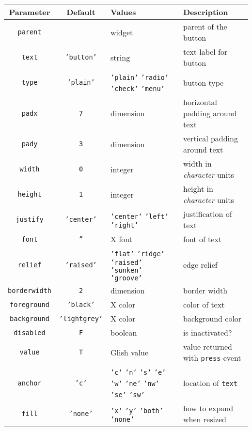 \begin{table}[tbh]
{\small
\begin{center}
\begin{tabular}{|c|c|p{1.6in}|p{1.9in}|}
\hline
Parameter & Default & Values & Description \\
\hline
\hline
{\tt parent}            &               & widget & parent of the button \\ \hline
{\tt text}              & {\tt 'button'}& string & text label for button \\ \hline
{\tt type}              & {\tt 'plain'} & {\tt 'plain'} {\tt 'radio'} {\tt 'check'} {\tt 'menu'} & button type \\ \hline
{\tt padx}              & {\tt 7}       & dimension & horizontal padding around text \\ \hline
{\tt pady}              & {\tt 3}       & dimension & vertical padding around text \\ \hline
{\tt width}             & {\tt 0}       & integer & width in {\em character} units\\ \hline
{\tt height}            & {\tt 1}       & integer & height in {\em character} units\\ \hline
{\tt justify}           & {\tt 'center'}& {\tt 'center'} {\tt 'left'} {\tt 'right'} & justification of text \\ \hline
{\tt font}              & {\tt ''}      & X font & font of text \\ \hline
{\tt relief}            & {\tt 'raised'}& {\tt 'flat'} {\tt 'ridge'} {\tt 'raised'} {\tt 'sunken'} {\tt 'groove'} & edge relief \\ \hline
{\tt borderwidth}       & {\tt 2}       & dimension & border width \\ \hline
{\tt foreground}        & {\tt 'black'} & X color & color of text \\ \hline
{\tt background}        & {\tt 'lightgrey'}& X color & background color \\ \hline
{\tt disabled}          & {\tt F}       & boolean & is inactivated? \\ \hline
{\tt value}             & {\tt T}       & Glish value & value returned with {\tt press} event \\ \hline
{\tt anchor}            & {\tt 'c'}     & {\tt 'c'} {\tt 'n'} {\tt 's'} {\tt 'e'} {\tt 'w'} {\tt 'ne'} {\tt 'nw'} {\tt 'se'} {\tt 'sw'} & location of {\tt text} \\ \hline
{\tt fill}		& {\tt 'none'}	& {\tt 'x'} {\tt 'y'} {\tt 'both'} {\tt 'none'} & how to expand when resized \\ \hline

\end{tabular}
\end{center}}
\end{table}
